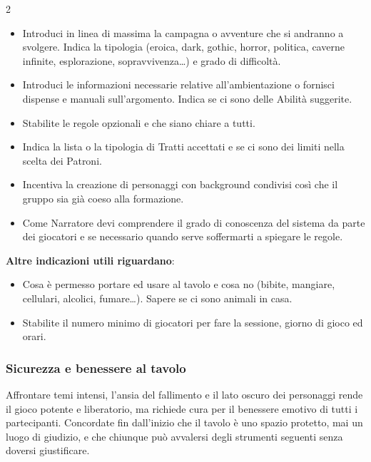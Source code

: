 \begin{multicols}{2}
\begin{itemize}[leftmargin=*] \setlength{\itemsep}{0pt}
\item Introduci in linea di massima la campagna o avventure che si andranno a svolgere. Indica la tipologia (eroica, dark, gothic, horror, politica, caverne infinite, esplorazione, sopravvivenza…) e grado di difficoltà.
\item Introduci le informazioni necessarie relative all'ambientazione o fornisci dispense e manuali sull'argomento. Indica se ci sono delle Abilità suggerite.
\item Stabilite le regole opzionali e che siano chiare a tutti.
\item Indica la lista o la tipologia di Tratti accettati e se ci sono dei limiti nella scelta dei Patroni.
\item Incentiva la creazione di personaggi con background condivisi così che il gruppo sia già coeso alla formazione.
\item Come Narratore devi comprendere il grado di conoscenza del sistema da parte dei giocatori e se necessario quando serve soffermarti a spiegare le regole.
\end{itemize}

\textbf{Altre indicazioni utili riguardano}:

\medskip

\begin{itemize}[leftmargin=*] \setlength{\itemsep}{0pt}
\item Cosa è permesso portare ed usare al tavolo e cosa no (bibite, mangiare, cellulari, alcolici, fumare…). Sapere se ci sono animali in casa.
\item Stabilite il numero minimo di giocatori per fare la sessione, giorno di gioco ed orari.
\end{itemize}

\subsubsection{Sicurezza e benessere al tavolo}\label{sicurezzatavolo}\hypertarget{sicurezzatavolo}{}

Affrontare temi intensi, l'ansia del fallimento e il lato oscuro dei personaggi rende il gioco potente e liberatorio, ma richiede cura per il benessere emotivo di tutti i partecipanti. Concordate fin dall'inizio che il tavolo è uno spazio protetto, mai un luogo di giudizio, e che chiunque può avvalersi degli strumenti seguenti senza doversi giustificare.


\end{multicols}
